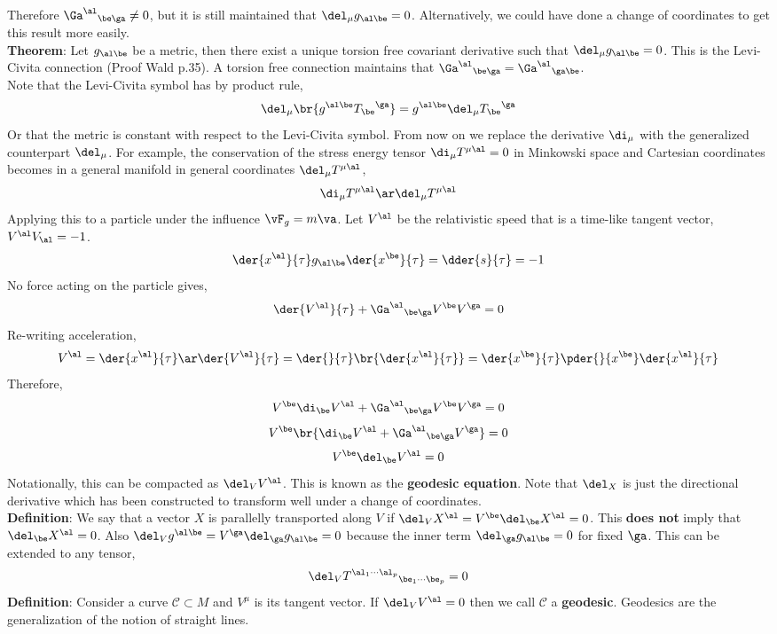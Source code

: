 \documentclass{article}
\begin{document}
Therefore ${\Ga^\al}_{\be\ga} \neq 0$, but it is still maintained that $\del_\mu g_{\al\be} = 0$. Alternatively, we could have done a change of coordinates to get this result more easily. \\

\textbf{Theorem}: Let $g_{\al\be}$ be a metric, then there exist a unique torsion free covariant derivative such that $\del_\mu g_{\al\be} = 0$. This is the Levi-Civita connection (Proof Wald p.35). A torsion free connection maintains that ${\Ga^\al}_{\be\ga} = {\Ga^\al}_{\ga\be}$. \\

Note that the Levi-Civita symbol has by product rule,
\[ \del_\mu \br{g^{\al\be}{T_{\be}}^\ga} = g^{\al\be} \del_\mu {T_\be}^\ga \]
Or that the metric is constant with respect to the Levi-Civita symbol. From now on we replace the derivative $\di_\mu$ with the generalized counterpart $\del_\mu$. For example, the conservation of the stress energy tensor $\di_\mu T^{\mu\al} = 0$ in Minkowski space and Cartesian coordinates becomes in a general manifold in general coordinates $\del_\mu T^{\mu\al}$,
\[ \di_\mu T^{\mu\al} \ar \del_\mu T^{\mu\al} \]
Applying this to a particle under the influence $\vF_g = m \va$. Let $V^\al$ be the relativistic speed that is a time-like tangent vector, $V^\al V_\al = -1$.
\[ \der{x^\al}{\tau} g_{\al\be}\der{x^\be}{\tau} = \dder{s}{\tau} = -1 \]
No force acting on the particle gives,
\[ \der{V^\al}{\tau} + {\Ga^\al}_{\be\ga} V^\be V^\ga = 0 \]
Re-writing acceleration,
\[ V^\al = \der{x^\al}{\tau} \ar \der{V^\al}{\tau} = \der{}{\tau}\br{\der{x^\al}{\tau}} = \der{x^\be}{\tau}\pder{}{x^\be} \der{x^\al}{\tau} \]
Therefore,
\[ V^\be \di_\be V^\al + {\Ga^\al}_{\be\ga} V^\be V^\ga = 0 \]
\[ V^\be \br{\di_\be V^\al + {\Ga^\al}_{\be\ga} V^\ga} = 0 \]
\[ V^\be \del_\be V^\al = 0 \]
Notationally, this can be compacted as $\del_V V^\al$. This is known as the \textbf{geodesic equation}. Note that $\del_X$ is just the directional derivative which has been constructed to transform well under a change of coordinates. \\

\textbf{Definition}: We say that a vector $X$ is parallelly transported along $V$ if $\del_V X^\al = V^\be \del_\be X^\al= 0$. This \textbf{does not} imply that $\del_\be X^\al = 0$. Also $\del_Vg^{\al\be} = V^\ga \del_\ga g_{\al\be} = 0$ because the inner term $\del_\ga g_{\al\be} = 0$ for fixed $\ga$. This can be extended to any tensor,
\[ \del_V {T^{\al_1 \cdots \al_p}}_{\be_1 \cdots \be_p} = 0 \]
\textbf{Definition}: Consider a curve $\mathcal{C} \subset M$ and $V^\mu$ is its tangent vector. If $\del_V V^\al = 0$ then we call $\mathcal{C}$ a \textbf{geodesic}. Geodesics are the generalization of the notion of straight lines.
\end{document}
